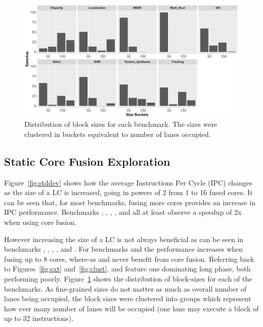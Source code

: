 \begin{figure}[t]
    \centering
    \includegraphics[width=1\textwidth]{cases-paper/graphics/Exploration/SizeBuckets.pdf}
    \caption{Distribution of block sizes for each benchmark. The sizes were clustered in buckets equivalent to number of lanes occupied.}
    \label{fig:block_sizes}
	\vspace{5mm}
\end{figure}
\subsection{Static Core Fusion Exploration}

Figure~\ref{fig:stddev} shows how the average Instructions Per Cycle (IPC) changes as the size of a LC is increased, going in powers of 2 from 1 to 16 fused cores.
It can be seen that, for most benchmarks, fusing more cores provides an increase in IPC performance.
Benchmarks , , , ,  and  all at least observe a speedup of 2x when using core fusion.

However increasing the size of a LC is not always beneficial as can be seen in benchmarks , , , , and .
For benchmarks  and  the performance increases when fusing up to 8 cores, where-as  and  never benefit from core fusion. 
Referring back to Figures~\ref{fig:sxt} and~\ref{fig:clust},  and  feature one dominating long phase, both performing poorly.
Figure~\ref{fig:block_sizes} shows the distribution of block-sizes for each of the benchmarks.
As fine-grained sizes do not matter as much as overall number of lanes being occupied, the block sizes were clustered into groups which represent how ever many number of lanes will be occupied (one lane may execute a block of up to 32 instructions).

